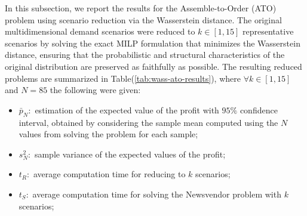 \documentclass[a4paper,12pt]{article}
\begin{document}
	In this subsection, we report the results for the Assemble-to-Order (ATO) problem using scenario reduction via the Wasserstein distance. The original multidimensional demand scenarios were reduced to $k \in [1,15]$ representative scenarios by solving the exact MILP formulation that minimizes the Wasserstein distance, ensuring that the probabilistic and structural characteristics of the original distribution are preserved as faithfully as possible. The resulting reduced problems are summarized in Table(\ref{tab:wass-ato-results}), where $\forall k \in [1,15]$  and $N = 85 $ the following were given:
	\begin{itemize}
		\item $\bar{p}_{N}:$ estimation of the expected value of the profit with $95\%$ confidence interval, obtained by considering the sample mean computed using the $N$ values from solving the problem for each sample;
		\item $s^{2}_{N}:$ sample variance of the expected values of the profit;
		\item $t_{R}:$ average computation time for reducing to $k$ scenarios;
		\item $t_{S}:$ average computation time for solving the Newsvendor problem with $k$ scenarios;
	\end{itemize}~
	
\end{document}
